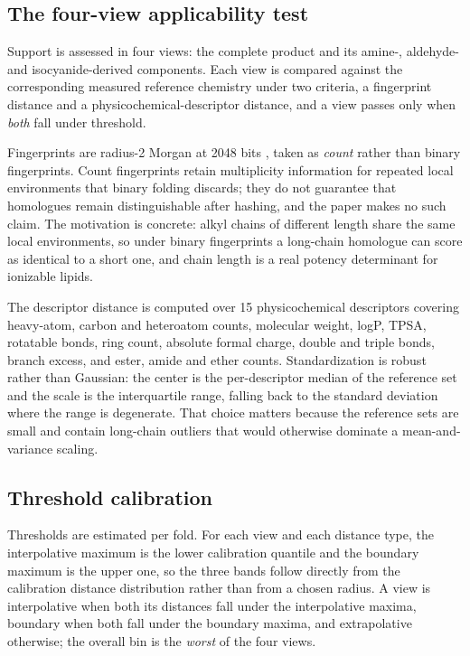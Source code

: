 \documentclass{article}
\begin{document}
\subsection{The four-view applicability test}
\label{app:fourview}

Support is assessed in four views: the complete product and its amine-, aldehyde- and
isocyanide-derived components. Each view is compared against the corresponding measured reference
chemistry under two criteria, a fingerprint distance and a physicochemical-descriptor distance, and a
view passes only when \emph{both} fall under threshold.

Fingerprints are radius-2 Morgan at 2048 bits \citep{rogers2010extended}, taken as \emph{count}
rather than binary fingerprints. Count fingerprints retain multiplicity information for repeated local
environments that binary folding discards; they do not guarantee that homologues remain
distinguishable after hashing, and the paper makes no such claim. The motivation is concrete: alkyl
chains of different length share the same local environments, so under binary fingerprints a
long-chain homologue can score as identical to a short one, and chain length is a real potency
determinant for ionizable lipids.

The descriptor distance is computed over 15 physicochemical descriptors covering heavy-atom, carbon
and heteroatom counts, molecular weight, logP, TPSA, rotatable bonds, ring count, absolute formal
charge, double and triple bonds, branch excess, and ester, amide and ether counts. Standardization is
robust rather than Gaussian: the center is the per-descriptor median of the reference set and the
scale is the interquartile range, falling back to the standard deviation where the range is
degenerate. That choice matters because the reference sets are small and contain long-chain outliers
that would otherwise dominate a mean-and-variance scaling.

\subsection{Threshold calibration}
\label{app:thresholds}
Thresholds are estimated per fold. For each view and each distance type, the interpolative maximum
is the lower calibration quantile and the boundary maximum is the upper one, so the three bands
follow directly from the calibration distance distribution rather than from a chosen radius. A view is
interpolative when both its distances fall under the interpolative maxima, boundary when both fall
under the boundary maxima, and extrapolative otherwise; the overall bin is the \emph{worst} of the
four views.
\end{document}
